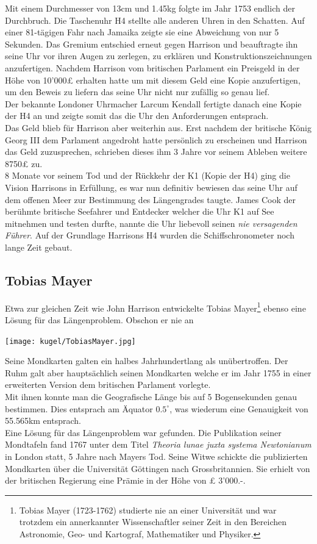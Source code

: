 \begin{refsection}
Mit einem Durchmesser von 13cm und 1.45kg folgte im Jahr 1753 endlich der Durchbruch.
Die Taschenuhr H4 stellte alle anderen Uhren in den Schatten. Auf einer 81-tägigen Fahr nach Jamaika zeigte sie eine Abweichung von nur 5 Sekunden.
Das Gremium entschied erneut gegen Harrison und beauftragte ihn seine Uhr vor ihren Augen zu zerlegen, zu erklären und Konstruktionszeichnungen anzufertigen.
Nachdem Harrison vom britischen Parlament ein Preisgeld in der Höhe von 10’000£ erhalten hatte um mit diesem Geld eine Kopie anzufertigen, um den Beweis zu liefern das seine Uhr nicht nur zufällig so genau lief.\\
Der bekannte Londoner Uhrmacher Larcum Kendall fertigte danach eine Kopie der H4 an und zeigte somit das die Uhr den Anforderungen entsprach.\\
Das Geld blieb für Harrison aber weiterhin aus. Erst nachdem der britische König Georg III dem Parlament angedroht hatte persönlich zu erscheinen und Harrison das Geld zuzusprechen, schrieben dieses ihm 3 Jahre vor seinem Ableben weitere 8750£ zu.\\
8 Monate vor seinem Tod und der Rückkehr der K1 (Kopie der H4) ging die Vision Harrisons in Erfüllung, es war nun definitiv bewiesen das seine Uhr auf dem offenen Meer zur Bestimmung des Längengrades taugte. James Cook der berühmte britische Seefahrer und Entdecker welcher die Uhr K1 auf See mitnehmen und testen durfte, nannte die Uhr liebevoll seinen \textit{nie versagenden Führer}.
Auf der Grundlage Harrisons H4 wurden die Schiffschronometer noch lange Zeit gebaut.



\subsection{Tobias Mayer}
Etwa zur gleichen Zeit wie John Harrison entwickelte Tobias Mayer\footnote{%
Tobias Mayer (1723-1762) studierte nie an einer Universität und war trotzdem ein annerkannter Wissenschaftler seiner Zeit in den Bereichen Astronomie, Geo- und Kartograf, Mathematiker und Physiker.}  ebenso eine Lösung für das Längenproblem. Obschon er nie an 


\begin{center}
        \texttt{[image: kugel/TobiasMayer.jpg]}
\end{center}

Seine Mondkarten galten ein halbes Jahrhundertlang als unübertroffen. Der Ruhm galt aber hauptsächlich seinen Mondkarten welche er im Jahr 1755 in einer erweiterten Version dem britischen Parlament vorlegte.\\
Mit ihnen konnte man die Geografische Länge bis auf 5 Bogensekunden genau bestimmen. Dies entsprach am Äquator $0.5 ^{\circ}$, was wiederum eine Genauigkeit von 55.565km entsprach.\\
Eine Lösung für das Längenproblem war gefunden. Die Publikation seiner Mondtafeln fand 1767 unter dem Titel \textit{Theoria lunae juxta systema Newtonianum} in London statt, 5 Jahre nach Mayers Tod. 
Seine Witwe schickte die publizierten Mondkarten über die Universität Göttingen nach Grossbritannien. Sie erhielt von der britischen Regierung eine Prämie in der Höhe von £ 3’000.-.


\end{refsection}

